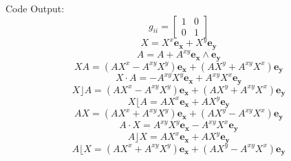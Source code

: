 \documentclass[10pt,fleqn]{report}
\begin{document}
Code Output:
\begin{equation*} g_{ii} = \left[\begin{matrix}1 & 0\\0 & 1\end{matrix}\right] \end{equation*}
\begin{equation*} X = X^{x} \boldsymbol{e_{x}} + X^{y} \boldsymbol{e_{y}} \end{equation*}
\begin{equation*} A = A  + A^{xy} \boldsymbol{e_{x}\wedge e_{y}} \end{equation*}
\begin{equation*} X A = \left ( A X^{x} - A^{xy} X^{y}\right ) \boldsymbol{e_{x}} + \left ( A X^{y} + A^{xy} X^{x}\right ) \boldsymbol{e_{y}} \end{equation*}
\begin{equation*} X\cdot A = - A^{xy} X^{y} \boldsymbol{e_{x}} + A^{xy} X^{x} \boldsymbol{e_{y}} \end{equation*}
\begin{equation*} X\rfloor A = \left ( A X^{x} - A^{xy} X^{y}\right ) \boldsymbol{e_{x}} + \left ( A X^{y} + A^{xy} X^{x}\right ) \boldsymbol{e_{y}} \end{equation*}
\begin{equation*} X\lfloor A = A X^{x} \boldsymbol{e_{x}} + A X^{y} \boldsymbol{e_{y}} \end{equation*}
\begin{equation*} A X = \left ( A X^{x} + A^{xy} X^{y}\right ) \boldsymbol{e_{x}} + \left ( A X^{y} - A^{xy} X^{x}\right ) \boldsymbol{e_{y}} \end{equation*}
\begin{equation*} A\cdot X = A^{xy} X^{y} \boldsymbol{e_{x}} - A^{xy} X^{x} \boldsymbol{e_{y}} \end{equation*}
\begin{equation*} A\rfloor X = A X^{x} \boldsymbol{e_{x}} + A X^{y} \boldsymbol{e_{y}} \end{equation*}
\begin{equation*} A\lfloor X = \left ( A X^{x} + A^{xy} X^{y}\right ) \boldsymbol{e_{x}} + \left ( A X^{y} - A^{xy} X^{x}\right ) \boldsymbol{e_{y}} \end{equation*}
\end{document}
